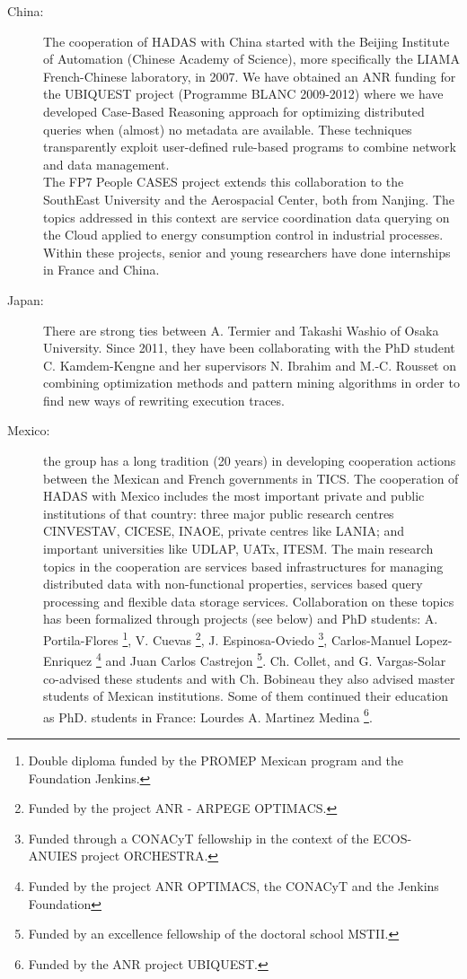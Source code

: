 \begin{description}

\item[China:] The cooperation of HADAS with China started with the Beijing Institute of Automation (Chinese Academy of Science), more specifically the LIAMA French-Chinese laboratory, in 2007. We have obtained an ANR funding for the UBIQUEST project (Programme BLANC 2009-2012) where we have developed Case-Based Reasoning approach for optimizing distributed queries when (almost) no metadata are available. These techniques transparently exploit user-defined rule-based programs to combine network and data management.\\
The FP7 People CASES project extends this collaboration to the SouthEast University and the Aerospacial Center, both from Nanjing. The topics addressed in this context are service coordination data querying on the  Cloud applied to energy consumption control in industrial processes. Within these projects, senior and young researchers have done internships in France and China.

\item[Japan:] 
There are strong ties between A. Termier and Takashi Washio of Osaka University. Since 2011, they have been collaborating with the PhD student C. Kamdem-Kengne and her supervisors N. Ibrahim and M.-C. Rousset on combining optimization methods and pattern mining algorithms in order to find new ways of rewriting execution traces.

\item[Mexico:] the group has a long tradition (20 years) in developing cooperation actions between the Mexican and French governments in TICS. 
The cooperation of HADAS with Mexico includes the most important private and public institutions of that country: three major public research centres CINVESTAV, CICESE, INAOE, private centres like LANIA; and important universities like UDLAP, UATx, ITESM. 
The main research topics in the cooperation are services based infrastructures for managing distributed data with non-functional properties, services based query processing and flexible data storage services.  Collaboration on these topics has been formalized through projects (see below) and PhD students: A. Portila-Flores \footnote{Double diploma funded by the PROMEP Mexican program and the Foundation Jenkins.}, V. Cuevas \footnote{Funded by the project ANR - ARPEGE OPTIMACS.}, J. Espinosa-Oviedo \footnote{Funded through a CONACyT fellowship in the context of the ECOS-ANUIES project ORCHESTRA.}, Carlos-Manuel Lopez-Enriquez \footnote{Funded by the project ANR OPTIMACS, the CONACyT and the Jenkins Foundation} and Juan Carlos Castrejon \footnote{Funded by an excellence fellowship of the doctoral school MSTII.}.  Ch. Collet, and G. Vargas-Solar co-advised these students and with Ch. Bobineau they also advised master students of Mexican institutions. Some of them continued their education as PhD. students in France: Lourdes A. Martinez Medina \footnote{Funded by the ANR project UBIQUEST.}. 


\end{description}

